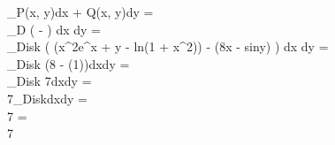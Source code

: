 \oint_{\gamma}P(x, y)dx + Q(x, y)dy =\\

\iint_{D}
\left(
 -
\right) dx dy =\\

\iint_{Disk}
\left(
(x^2e^x + y - ln(1 + x^2)) -
(8x - siny)
\right) dx dy =\\

\iint_{Disk} (8 - (1))dxdy =\\

\iint_{Disk} 7dxdy =\\

7\iint_{Disk}dxdy =\\
7 \cdot {} =\\
7\pi